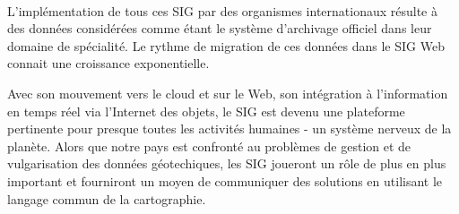 
\paragraph{}
L’implémentation de tous ces SIG  par des organismes internationaux résulte à des données considérées 
comme étant le système d’archivage officiel dans leur domaine de spécialité.
Le rythme de migration de ces données dans le SIG Web connait une croissance exponentielle. 
\par
Avec son mouvement vers le cloud et sur le Web, son intégration à l'information 
en temps réel via l'Internet des objets, le SIG est devenu une plateforme 
pertinente pour presque toutes les activités humaines - un système nerveux de 
la planète. Alors que notre pays est confronté au problèmes de gestion et de vulgarisation 
des données géotechiques, les SIG joueront un rôle de plus 
en plus important et 
fourniront un moyen de communiquer des solutions en utilisant le langage commun de 
la cartographie.